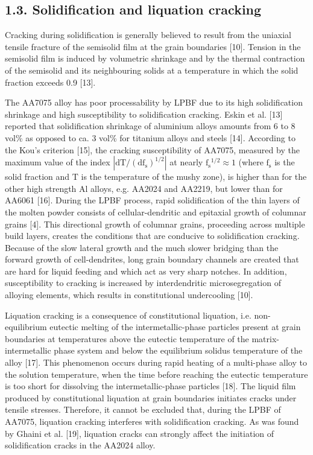 \documentclass[10pt]{article}
\begin{document}
\subsection*{1.3. Solidification and liquation cracking}
Cracking during solidification is generally believed to result from the uniaxial tensile fracture of the semisolid film at the grain boundaries [10]. Tension in the semisolid film is induced by volumetric shrinkage and by the thermal contraction of the semisolid and its neighbouring solids at a temperature in which the solid fraction exceeds 0.9 [13].

The AA7075 alloy has poor processability by LPBF due to its high solidification shrinkage and high susceptibility to solidification cracking. Eskin et al. [13] reported that solidification shrinkage of aluminium alloys amounts from 6 to 8 vol\% as opposed to ca. 3 vol\% for titanium alloys and steels [14]. According to the Kou's criterion [15], the cracking susceptibility of AA7075, measured by the maximum value of the index $\left|\mathrm{dT} /\left(\mathrm{df}_{\mathrm{s}}\right)^{1 / 2}\right|$ at nearly $\mathrm{f}_{\mathrm{s}}{ }^{1 / 2} \approx 1$ (where $\mathrm{f}_{\mathrm{s}}$ is the solid fraction and $\mathrm{T}$ is the temperature of the mushy zone), is higher than for the other high strength Al alloys, e.g. AA2024 and AA2219, but lower than for AA6061 [16]. During the LPBF process, rapid solidification of the thin layers of the molten powder consists of cellular-dendritic and epitaxial growth of columnar grains [4]. This directional growth of columnar grains, proceeding across multiple build layers, creates the conditions that are conducive to solidification cracking. Because of the slow lateral growth and the much slower bridging than the forward growth of cell-dendrites, long grain boundary channels are created that are hard for liquid feeding and which act as very sharp notches. In addition, susceptibility to cracking is increased by interdendritic microsegregation of alloying elements, which results in constitutional undercooling [10].

Liquation cracking is a consequence of constitutional liquation, i.e. non-equilibrium eutectic melting of the intermetallic-phase particles present at grain boundaries at temperatures above the eutectic temperature of the matrix-intermetallic phase system and below the equilibrium solidus temperature of the alloy [17]. This phenomenon occurs during rapid heating of a multi-phase alloy to the solution temperature, when the time before reaching the eutectic temperature is too short for dissolving the intermetallic-phase particles [18]. The liquid film produced by constitutional liquation at grain boundaries initiates cracks under tensile stresses. Therefore, it cannot be excluded that, during the LPBF of AA7075, liquation cracking interferes with solidification cracking. As was found by Ghaini et al. [19], liquation cracks can strongly affect the initiation of solidification cracks in the AA2024 alloy.
\end{document}
